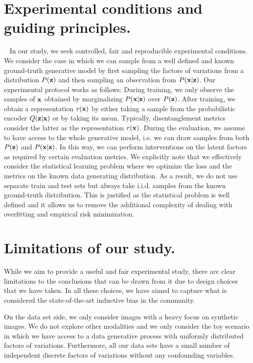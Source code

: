  \section{Experimental conditions and guiding principles.}~\label{app:guiding_principles}
In our study, we seek controlled, fair and reproducible experimental conditions. 
We consider the case in which we can sample from a well defined and known ground-truth generative model by first sampling the factors of variations from a distribution $P({\mathbf{z}})$ and then sampling an observation from $P({\mathbf{x}} | {\mathbf{z}})$. 
Our experimental protocol works as follows:
During training, we only observe the samples of ${\mathbf{x}}$ obtained by marginalizing $P({\mathbf{x}} | {\mathbf{z}})$ over $P({\mathbf{z}})$. After training, we obtain a representation $r({\mathbf{x}})$ by either taking a sample from the probabilistic encoder $Q({\mathbf{z}}|{\mathbf{x}})$ or by taking its mean. 
Typically, disentanglement metrics consider the latter as the representation $r({\mathbf{x}})$. 
During the evaluation, we assume to have access to the whole generative model, i.e. we can draw samples from both $P({\mathbf{z}})$ and $P({\mathbf{x}} | {\mathbf{z}})$. 
In this way, we can perform interventions on the latent factors as required by certain evaluation metrics. 
We explicitly note that we effectively consider the statistical learning problem where we optimize the loss and the metrics on the known data generating distribution. 
As a result, we do not use separate train and test sets but always take i.i.d. samples from the known ground-truth distribution.
This is justified as the statistical problem is well defined and it allows us to remove the additional complexity of dealing with overfitting and empirical risk minimization.
\section{Limitations of our study.}\label{app:limitations}
While we aim to provide a useful and fair experimental study, there are clear limitations to the conclusions that can be drawn from it due to design choices that we have taken.
In all these choices, we have aimed to capture what is considered the state-of-the-art inductive bias in the community.

On the data set side, we only consider images with a heavy focus on synthetic images. 
We do not explore other modalities and we only consider the toy scenario in which we have access to a data generative process with uniformly distributed factors of variations. 
Furthermore, all our data sets have a small number of independent discrete factors of variations without any confounding variables.

